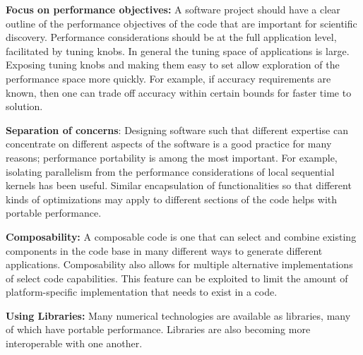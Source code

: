 \documentclass[]{article}
\begin{document}
\textbf{Focus on performance objectives:} A software project should have
a clear outline of the performance objectives of the code that are
important for scientific discovery. Performance considerations should be
at the full application level, facilitated by tuning knobs. In general
the tuning space of applications is large. Exposing tuning knobs and
making them easy to set allow exploration of the performance space more
quickly. For example, if accuracy requirements are known, then one can
trade off accuracy within certain bounds for faster time to solution.

\textbf{Separation of concerns}: Designing software such that different
expertise can concentrate on different aspects of the software is a good
practice for many reasons; performance portability is among the most
important. For example, isolating parallelism from the performance
considerations of local sequential kernels has been useful. Similar
encapsulation of functionalities so that different kinds of
optimizations may apply to different sections of the code helps with
portable performance.

\textbf{Composability:} A composable code is one that can select and
combine existing components in the code base in many different ways to
generate different applications. Composability also allows for multiple
alternative implementations of select code capabilities. This feature
can be exploited to limit the amount of platform-specific implementation
that needs to exist in a code.

\textbf{Using Libraries:} Many numerical technologies are available as
libraries, many of which have portable performance. Libraries are also
becoming more interoperable with one another.
\end{document}
